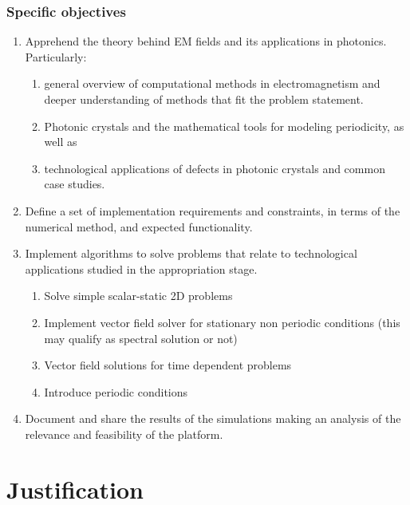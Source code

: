 \subsubsection{Specific objectives}
\begin{enumerate}
\item  Apprehend the theory behind EM fields and its applications in photonics. Particularly: 
\begin{enumerate}
	 \item general overview of computational methods in electromagnetism and deeper understanding of methods that fit the problem statement.
	 \item Photonic crystals and the mathematical tools for modeling periodicity, as well as 
	 \item technological applications of defects in photonic crystals and common case studies. 
\end{enumerate}

\item Define a set of implementation requirements and constraints, in terms of the numerical method, and expected functionality.  

\item Implement algorithms to solve problems that relate to technological applications studied in the appropriation stage. 
	\begin{enumerate}
	\item Solve simple scalar-static 2D problems
	\item Implement vector field solver for stationary non periodic conditions (this may qualify as spectral solution or not)
	\item Vector field solutions for time dependent problems
	\item Introduce periodic conditions
	\end{enumerate}
	
\item Document and share the results of the simulations making an analysis of the relevance and feasibility of the platform. 
\end{enumerate}
\pagebreak
\section{Justification}

